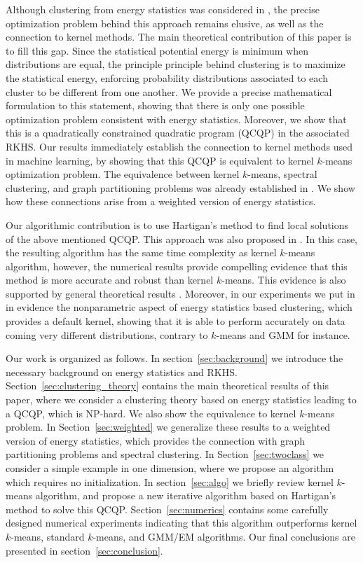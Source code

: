 \documentclass[aps,preprint,nofootinbib,floatfix]{revtex4-1}
\begin{document}
Although clustering from energy statistics was considered
in \cite{Kgroups}, the precise optimization problem behind this approach
remains elusive, as well as the connection to kernel methods.
The main theoretical contribution of this paper is to fill this gap.
Since the statistical potential energy is minimum when
distributions are equal, the principle 
principle behind clustering is to maximize the statistical energy, 
enforcing probability distributions associated to each cluster
to be different from one another.
We provide a precise mathematical formulation to this
statement, showing that there is only one possible optimization problem
consistent with energy statistics. Moreover, we show that this is
a quadratically constrained
quadratic program (QCQP) in the associated RKHS. Our results immediately 
establish the connection 
to kernel methods used in machine learning, 
by showing that this QCQP is equivalent
to kernel $k$-means optimization problem. 
The equivalence between kernel $k$-means, 
spectral clustering, and graph partitioning problems was already established
in \cite{Dhillon,Dhillon2}. We show how these connections arise
from a weighted version of energy statistics.

Our algorithmic contribution is to use Hartigan's method
\cite{Hartigan} to find local solutions of the above mentioned QCQP.
This approach was also proposed in \cite{Kgroups}. In this case,
the resulting algorithm has the same
time complexity as kernel $k$-means algorithm, however, the numerical 
results provide compelling evidence that this method
is more accurate and robust than kernel $k$-means. This evidence
is also supported by general theoretical results \cite{Telgarsky,Slonin}.
Moreover, in our experiments we put in
in evidence the nonparametric aspect of energy
statistics based clustering, which provides a default kernel, showing that
it is able to perform accurately on data coming very different 
distributions, contrary to $k$-means and GMM for instance.

Our work is organized as follows. In section~\ref{sec:background} we introduce
the necessary background on energy statistics and RKHS.
Section~\ref{sec:clustering_theory} contains the main theoretical 
results of this paper,
where we consider a clustering theory based on energy statistics leading
to a QCQP, which is NP-hard. We also show the equivalence to 
kernel $k$-means problem.
In Section~\ref{sec:weighted} we generalize these results to a weighted
version of energy statistics, which provides the connection with graph
partitioning problems and spectral clustering.
In Section~\ref{sec:twoclass} we consider a simple example in one dimension,
where we propose an algorithm which requires no initialization.
In section~\ref{sec:algo} we briefly review kernel $k$-means algorithm,
and propose a new iterative algorithm based on Hartigan's method
to solve this QCQP.
Section~\ref{sec:numerics} contains some carefully designed numerical
experiments indicating that this algorithm outperforms kernel
$k$-means, standard $k$-means, and GMM/EM algorithms.
Our final conclusions are presented in section~\ref{sec:conclusion}.
\end{document}
